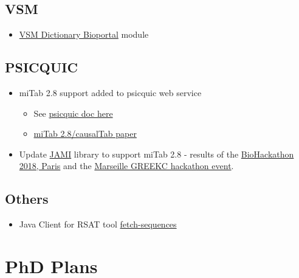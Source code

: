 \documentclass[12pt,]{book}
\providecommand{\tightlist}{%
  \setlength{\itemsep}{0pt}\setlength{\parskip}{0pt}}
\theoremstyle{definition}
\theoremstyle{definition}
\theoremstyle{definition}
\theoremstyle{remark}
\begin{document}
\hypertarget{vsm}{%
\section{VSM}\label{vsm}}

\begin{itemize}
\tightlist
\item
  \href{https://github.com/vsmjs/vsm-dictionary-bioportal/}{VSM Dictionary Bioportal} module
\end{itemize}

\hypertarget{psicquic}{%
\section{PSICQUIC}\label{psicquic}}

\begin{itemize}
\tightlist
\item
  miTab 2.8 support added to psicquic web service

  \begin{itemize}
  \tightlist
  \item
    See \href{http://psicquic.github.io/MITAB28Format.html}{psicquic doc here}
  \item
    \href{https://doi.org/10.1093/bioinformatics/btz132}{miTab 2.8/causalTab paper}
  \end{itemize}
\item
  Update \href{https://github.com/MICommunity/psi-jami}{JAMI} library to support
  miTab 2.8 - results of the \href{http://bh2018paris.info/}{BioHackathon 2018, Paris}
  and the \href{https://github.com/GREEKC/hackathon-marseille/tree/master/project_descriptions/causal_psicquic}{Marseille GREEKC hackathon event}.
\end{itemize}

\hypertarget{others}{%
\section{Others}\label{others}}

\begin{itemize}
\tightlist
\item
  Java Client for RSAT tool \href{https://github.com/bblodfon/rsat-rest-java-clients}{fetch-sequences}
\end{itemize}

\hypertarget{phd-plans}{%
\chapter{PhD Plans}\label{phd-plans}}
\end{document}
